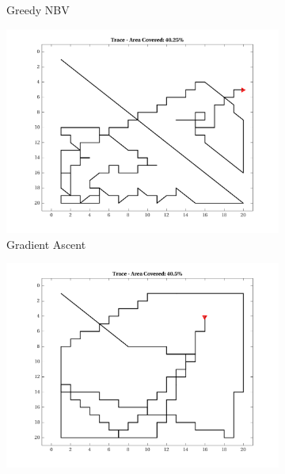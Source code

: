\begin{figure}[htb!]
\begin{subfigure}[t]{0.3333\textwidth}
        \captionsetup{skip=0.20\baselineskip,size=footnotesize}
        \caption{Greedy NBV}
    \end{subfigure}%
    \begin{subfigure}[t]{0.3333\textwidth}
        \centering
        \includegraphics[width=\linewidth]{figures/hbresults/path_gradient_40p_20x20_sf_4_seed_2.png}
        \captionsetup{skip=0.20\baselineskip,size=footnotesize}
        \caption{Gradient Ascent}
    \end{subfigure}%
    \begin{subfigure}[t]{0.3333\textwidth}
        \centering
        \includegraphics[width=\linewidth]{figures/hbresults/path_gr_40p_20x20_sf_4_seed_2.png}
        \captionsetup{skip=0.20\baselineskip,size=footnotesize}

\end{subfigure}
\end{figure}
